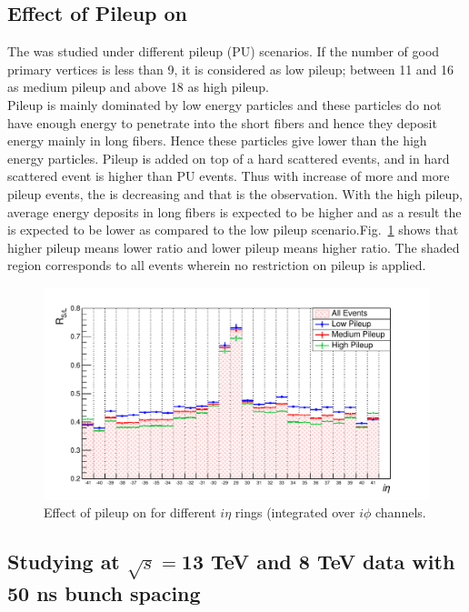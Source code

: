 \begin{itemize}
\subsection{Effect of Pileup on \ratiosl}\label{pileup}
The \ratiosl was studied under different pileup (PU) scenarios. If the number 
of good primary vertices is less than 9, it is considered as low pileup; 
between 11 and 16 as medium pileup and above 18 as high pileup.\\
Pileup is mainly dominated by low energy particles
and these particles do not have enough energy to penetrate into the short fibers and hence they deposit energy mainly in long fibers.
Hence these particles give lower \ratiosl than the high energy particles. Pileup is added on top of
a hard scattered events, and in hard scattered event \ratiosl is higher than PU events. Thus 
with increase of more and more pileup events, the \ratiosl is decreasing and that is the observation. With the high pileup, average energy deposits in long fibers is expected 
to be higher and as a result the \ratiosl is expected to be lower as 
compared to the low pileup scenario.Fig.~\ref{RvsIetaComparePileups} shows 
that higher pileup means lower ratio and lower pileup means higher ratio. 
The shaded region corresponds to all events wherein no restriction on pileup is 
applied.

\begin{figure}[h!]
\centering
\includegraphics[width=0.7\linewidth]{../Figures/Chap2/ImageFiles_HF/Ratio/RvsIetaComparePileups.pdf}
\captionsetup{width=.9\linewidth}
\caption[Effect of pileup on \ratiosl for different $i\eta$]{Effect of pileup on \ratiosl for different $i\eta$ rings (integrated over $i\phi$ channels.}
\label{RvsIetaComparePileups}
\end{figure}

\end{itemize}


\subsection{Studying \ratiosl at $\sqrt{s}=$13 TeV and 8 TeV data with 50 ns bunch spacing}\label{sec:ana50ns}

